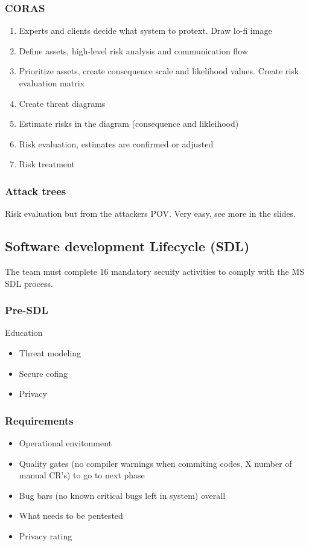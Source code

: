 \documentclass[course, english]{Notes}
\begin{document}
\subsubsection{CORAS}
\begin{enumerate}
	\item Experts and clients decide what system to protext. Draw lo-fi
		image
	\item Define assets, high-level risk analysis and communication flow
	\item Prioritize assets, create consequence scale and likelihood values.
		Create risk evaluation matrix
	\item Create threat diagrams
	\item Estimate risks in the diagram (consequence and likleihood)
	\item Risk evaluation, estimates are confirmed or adjusted
	\item Risk treatment
\end{enumerate}
\subsubsection{Attack trees}
Risk evaluation but from the attackers POV. Very easy, see more in the slides.

\subsection{Software development Lifecycle (SDL)}
The team must complete 16 mandatory secuity activities to comply with the MS SDL
process.

\subsubsection{Pre-SDL}
Education
\begin{itemize}
	\item Threat modeling
	\item Secure cofing
	\item Privacy
\end{itemize}
\subsubsection{Requirements}
\begin{itemize}
	\item Operational envitonment
	\item Quality gates (no compiler warnings when commiting codes, X number
		of manual CR's) to go to next phase
	\item Bug bars (no known critical bugs left in system) overall
	\item What needs to be pentested
	\item Privacy rating
		
\end{itemize}
\end{document}
